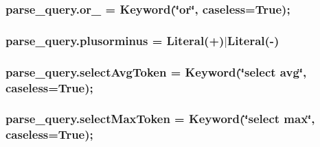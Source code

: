 \subsubsection[{\texorpdfstring{or\+\_\+}{or_}}]{\setlength{\rightskip}{0pt plus 5cm}parse\+\_\+query.\+or\+\_\+ = Keyword(\char`\"{}or\char`\"{}, caseless=True);}\hypertarget{namespaceparse__query_a8d9f764c774421bbc4bc8b8e40f32668}{}\label{namespaceparse__query_a8d9f764c774421bbc4bc8b8e40f32668}
\subsubsection[{\texorpdfstring{plusorminus}{plusorminus}}]{\setlength{\rightskip}{0pt plus 5cm}parse\+\_\+query.\+plusorminus = Literal(\textquotesingle{}+\textquotesingle{})$\vert$Literal(\textquotesingle{}-\/\textquotesingle{})}\hypertarget{namespaceparse__query_ac5dcea7577abdac23037689af0a2dc7d}{}\label{namespaceparse__query_ac5dcea7577abdac23037689af0a2dc7d}
\subsubsection[{\texorpdfstring{select\+Avg\+Token}{selectAvgToken}}]{\setlength{\rightskip}{0pt plus 5cm}parse\+\_\+query.\+select\+Avg\+Token = Keyword(\char`\"{}select avg\char`\"{}, caseless=True);}\hypertarget{namespaceparse__query_a584d3222777d316fea832ec01d0b3c5f}{}\label{namespaceparse__query_a584d3222777d316fea832ec01d0b3c5f}
\subsubsection[{\texorpdfstring{select\+Max\+Token}{selectMaxToken}}]{\setlength{\rightskip}{0pt plus 5cm}parse\+\_\+query.\+select\+Max\+Token = Keyword(\char`\"{}select max\char`\"{}, caseless=True);}\hypertarget{namespaceparse__query_a05b504fbc190ae99066e3bbea8d3cb06}{}\label{namespaceparse__query_a05b504fbc190ae99066e3bbea8d3cb06}
